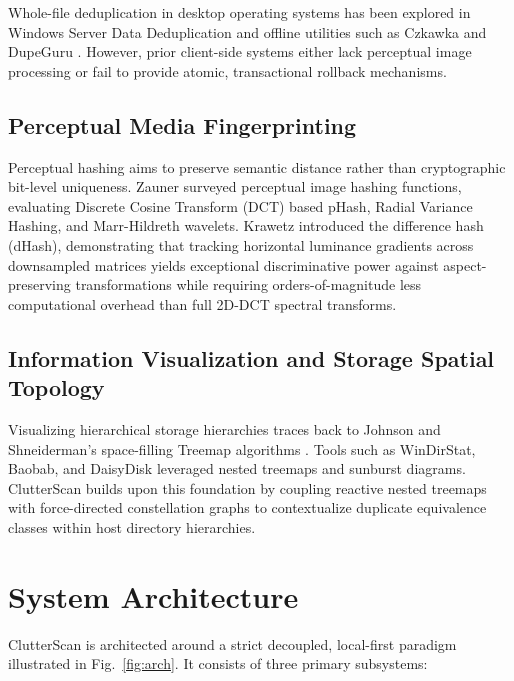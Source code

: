 \documentclass[journal,compsoc,10pt,twocolumn]{IEEEtran}
\begin{document}
Whole-file deduplication in desktop operating systems has been explored in Windows Server Data Deduplication \cite{elshawi2014dedup} and offline utilities such as Czkawka \cite{czkawka2024} and DupeGuru \cite{harding2020dupeguru}. However, prior client-side systems either lack perceptual image processing or fail to provide atomic, transactional rollback mechanisms.

\subsection{Perceptual Media Fingerprinting}
Perceptual hashing aims to preserve semantic distance rather than cryptographic bit-level uniqueness. Zauner \cite{zauner2010phash} surveyed perceptual image hashing functions, evaluating Discrete Cosine Transform (DCT) based pHash, Radial Variance Hashing, and Marr-Hildreth wavelets. Krawetz \cite{krawetz2011dhash} introduced the difference hash (dHash), demonstrating that tracking horizontal luminance gradients across downsampled matrices yields exceptional discriminative power against aspect-preserving transformations while requiring orders-of-magnitude less computational overhead than full 2D-DCT spectral transforms.

\subsection{Information Visualization and Storage Spatial Topology}
Visualizing hierarchical storage hierarchies traces back to Johnson and Shneiderman's space-filling Treemap algorithms \cite{shneiderman1992treemaps, johnson1991treemaps}. Tools such as WinDirStat, Baobab, and DaisyDisk leveraged nested treemaps and sunburst diagrams. ClutterScan builds upon this foundation by coupling reactive nested treemaps with force-directed constellation graphs to contextualize duplicate equivalence classes within host directory hierarchies.

\section{System Architecture}
\label{sec:architecture}
ClutterScan is architected around a strict decoupled, local-first paradigm illustrated in Fig.~\ref{fig:arch}. It consists of three primary subsystems:
\end{document}
